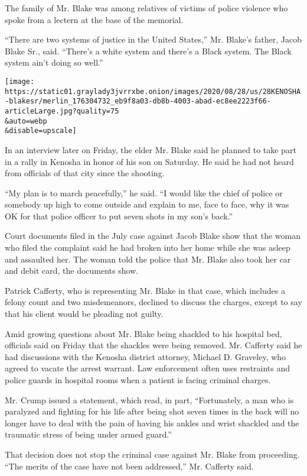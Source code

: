 The family of Mr. Blake was among relatives of victims of police
violence who spoke from a lectern at the base of the memorial.

``There are two systems of justice in the United States,'' Mr. Blake's
father, Jacob Blake Sr., said. ``There's a white system and there's a
Black system. The Black system ain't doing so well.''

\texttt{[image: https://static01.graylady3jvrrxbe.onion/images/2020/08/28/us/28KENOSHA-blakesr/merlin\_176304732\_eb9f8a03-db8b-4003-abad-ec8ee2223f66-articleLarge.jpg?quality=75\\\&auto=webp\\\&disable=upscale]}

In an interview later on Friday, the elder Mr. Blake said he planned to
take part in a rally in Kenosha in honor of his son on Saturday. He said
he had not heard from officials of that city since the shooting.

``My plan is to march peacefully,'' he said. ``I would like the chief of
police or somebody up high to come outside and explain to me, face to
face, why it was OK for that police officer to put seven shots in my
son's back.''

Court documents filed in the July case against Jacob Blake show that the
woman who filed the complaint said he had broken into her home while she
was asleep and assaulted her. The woman told the police that Mr. Blake
also took her car and debit card, the documents show.

Patrick Cafferty, who is representing Mr. Blake in that case, which
includes a felony count and two misdemeanors, declined to discuss the
charges, except to say that his client would be pleading not guilty.

Amid growing questions about Mr. Blake being shackled to his hospital
bed, officials said on Friday that the shackles were being removed. Mr.
Cafferty said he had discussions with the Kenosha district attorney,
Michael D. Graveley, who agreed to vacate the arrest warrant. Law
enforcement often uses restraints and police guards in hospital rooms
when a patient is facing criminal charges.

Mr. Crump issued a statement, which read, in part, ``Fortunately, a man
who is paralyzed and fighting for his life after being shot seven times
in the back will no longer have to deal with the pain of having his
ankles and wrist shackled and the traumatic stress of being under armed
guard.''

That decision does not stop the criminal case against Mr. Blake from
proceeding. ``The merits of the case have not been addressed,'' Mr.
Cafferty said.

